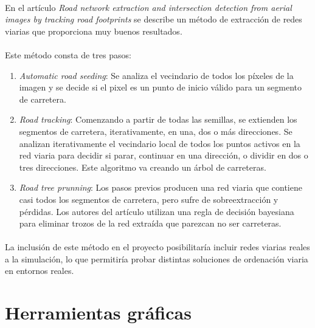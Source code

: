 	\paragraph{}
	En el artículo \emph{Road network extraction and intersection detection from aerial images by tracking road footprints} \cite{JiuxiangHu2007} se describe un método de extracción de redes viarias que proporciona muy buenos resultados.
	
	\paragraph{}
	Este método consta de tres pasos:
	\begin{enumerate}	
	\item \emph{Automatic road seeding}: Se analiza el vecindario de todos los píxeles de la imagen y se decide si el pixel es un punto de inicio válido para un segmento de carretera.
	\item \emph{Road tracking}: Comenzando a partir de todas las semillas, se extienden los segmentos de carretera, iterativamente, en una, dos o más direcciones. Se analizan iterativamente el vecindario local de todos los puntos activos en la red viaria para decidir si parar, continuar en una dirección, o dividir en dos o tres direcciones. Este algoritmo va creando un árbol de carreteras.
	\item \emph{Road tree prunning}: Los pasos previos producen una red viaria que contiene casi todos los segmentos de carretera, pero sufre de sobreextracción y pérdidas. Los autores del artículo utilizan una regla de decisión bayesiana para eliminar trozos de la red extraída que parezcan no ser carreteras.
	\end{enumerate}
	
	\paragraph{}
	La inclusión de este método en el proyecto posibilitaría incluir redes viarias reales a la simulación, lo que permitiría probar distintas soluciones de ordenación viaria en entornos reales.

\section{Herramientas gráficas}

	\paragraph{}
	